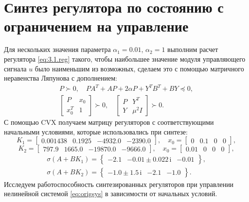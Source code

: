 \section{Синтез регулятора по состоянию с ограничением на управление}
\label{sec:4.4}
Для нескольких значения параметра $\alpha_1=0.01$, $\alpha_2=1$ выполним расчет регулятора \eqref{eq:3.1.reg} 
такого, чтобы наибольшее значение модуля управляющего сигнала $u$ было 
наименьшим из возможных, сделаем это с помощью матричного неравенства
Ляпунова с дополнением:
\begin{gather*}
    P\succ0,\quad PA^T+AP+2\alpha P+Y^TB^T+BY\preccurlyeq 0,\\
    \begin{bmatrix}
        P&x_0\\x_0^T&1
    \end{bmatrix}\succ0,\quad
    \begin{bmatrix}
        P&Y^T\\Y&\mu^2I
    \end{bmatrix}\succ0.
\end{gather*}
С помощью CVX получаем матрицу регуляторов с соответствующими начальными
условиями, которые использовались при синтезе:
\begin{equation*}
    K_1=\begin{bmatrix}
0.001438 & 0.1925 & -4932.0 & -2390.0
    \end{bmatrix},\quad
        x_0=\begin{bmatrix}
        0&0.1&0&0
    \end{bmatrix},
\end{equation*}
\begin{equation}
    \label{eq:4.4.K2}
    K_2=\begin{bmatrix}
797.9 & 1665.0 & -19870.0 & -9666.0
    \end{bmatrix},\quad
    x_0=\begin{bmatrix}
        0.01&0&0&0
    \end{bmatrix},
\end{equation}
\begin{gather*}
        \sigma(A+BK_1)=\left\{\begin{array}{ccc}
        -2.1&
        -0.01\pm0.022\,\mathrm{i}&
        -0.01
    \end{array}\right\},\\
        \sigma(A+BK_2)=\left\{\begin{array}{ccc}
-1.0\pm1.5\,\mathrm{i}&
-2.1&
-1.0
\end{array}\right\}.
\end{gather*}
Исследуем работоспособность синтезированных регуляторов при управлении 
нелинейной системой \eqref{eq:origsys} в зависимости от начальных условий.

